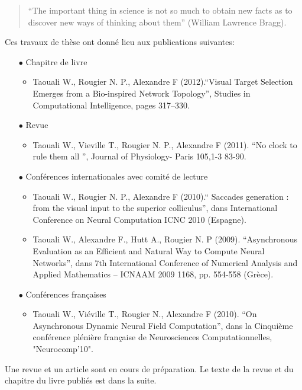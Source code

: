 \DontNumberThisInToc
\DontFrameThisInToc
{}
\begin{quote}
``The important thing in science is not so much to obtain new facts as to discover new ways of thinking about them'' (William Lawrence Bragg).
\end{quote}
Ces travaux de thèse ont donné lieu aux publications suivantes: \\

\begin{itemize}
\item[$\bullet$]Chapitre de livre\\
\begin{itemize}
\item Taouali W., Rougier N. P., Alexandre F (2012).``Visual Target Selection Emerges from a Bio-inspired Network Topology'', Studies in Computational Intelligence, pages 317--330.\\
\end{itemize}
\item[$\bullet$] Revue\\
\begin{itemize}
\item Taouali W., Vieville T., Rougier N. P., Alexandre F (2011). ``No clock to rule them all '',  Journal of Physiology- Paris 105,1-3  83-90.\\
\end{itemize}
\item[$\bullet$]Conférences internationales avec comité de lecture\\
\begin{itemize}
\item Taouali W., Rougier N. P., Alexandre F (2010).`` Saccades generation : from the visual input to the superior colliculus'', dans International Conference on Neural Computation ICNC 2010 (Espagne).\\
\item Taouali W., Alexandre F., Hutt A., Rougier N. P (2009). ``Asynchronous Evaluation as an Efficient and Natural Way to Compute Neural Networks'', dans 7th International Conference of Numerical Analysis and Applied Mathematics – ICNAAM 2009 1168, pp. 554-558 (Grèce).\\
\end{itemize}
\item[$\bullet$] Conférences françaises\\
\begin{itemize}
\item  Taouali W., Viéville T., Rougier N., Alexandre F (2010). ``On Asynchronous Dynamic Neural Field Computation'', dans la Cinquième conférence plénière française de Neurosciences Computationnelles,
"Neurocomp'10".\\
\end{itemize}
\end{itemize}

Une revue et un article sont en cours de préparation. Le texte de la revue et du chapitre du livre publiés est dans la suite.\\



